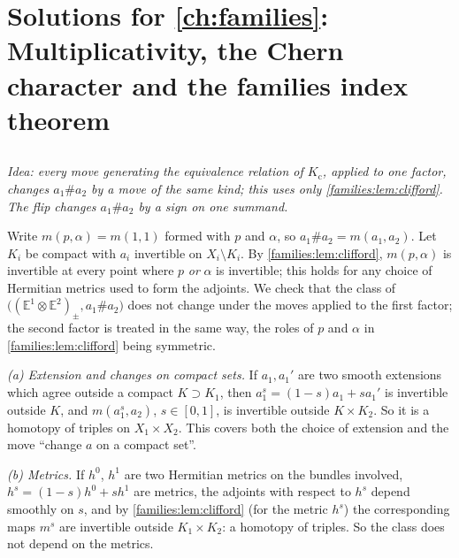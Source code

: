 \providecommand{\Ch}{\operatorname{Ch}}
\providecommand{\Chodd}{\operatorname{Ch}_{\mathrm{odd}}}
\providecommand{\Kc}{K_{\mathrm{c}}}
\providecommand{\inda}{\operatorname{ind}_{\mathrm{a}}}
\providecommand{\Torus}{\mathbb{T}}

\section{Solutions for \cref{ch:families}: Multiplicativity, the Chern character and the families index theorem}\label{solutions:ch:families}

\subsection*{}
\emph{Idea: every move generating the equivalence relation of $\Kc$, applied to one
factor, changes $a_1\#a_2$ by a move of the same kind; this uses only
\cref{families:lem:clifford}. The flip changes $a_1\#a_2$ by a sign on one summand.}

Write $m(p,\alpha)=m(1,1)$ formed with $p$ and $\alpha$, so $a_1\#a_2=m(a_1,a_2)$. Let
$K_i$ be compact with $a_i$ invertible on $X_i\setminus K_i$. By
\cref{families:lem:clifford}, $m(p,\alpha)$ is invertible at every point where $p$
\emph{or} $\alpha$ is invertible; this holds for any choice of Hermitian metrics used
to form the adjoints. We check that the class of $\bigl((\mathbb
E^1\otimes\mathbb E^2)_\pm,a_1\#a_2\bigr)$ does not change under the moves applied
to the first factor; the second factor is treated in the same way, the roles of $p$
and $\alpha$ in \cref{families:lem:clifford} being symmetric.

\emph{(a) Extension and changes on compact sets.} If $a_1,a_1'$ are two smooth
extensions which agree outside a compact $K\supset K_1$, then
$a_1^s=(1-s)a_1+sa_1'$ is invertible outside $K$, and $m(a_1^s,a_2)$, $s\in[0,1]$, is
invertible outside $K\times K_2$. So it is a homotopy of triples on $X_1\times X_2$.
This covers both the choice of extension and the move ``change $a$ on a compact
set''.

\emph{(b) Metrics.} If $h^0$, $h^1$ are two Hermitian metrics on the bundles
involved, $h^s=(1-s)h^0+sh^1$ are metrics, the adjoints with respect to $h^s$ depend
smoothly on $s$, and by \cref{families:lem:clifford} (for the metric $h^s$) the
corresponding maps $m^s$ are invertible outside $K_1\times K_2$: a homotopy of triples.
So the class does not depend on the metrics.

